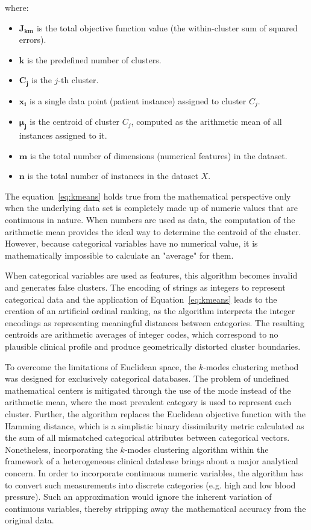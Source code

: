 where:
\begin{itemize}
    \item $\boldsymbol{J_{km}}$ is the total objective function value (the within-cluster sum of squared errors).
    \item $\boldsymbol{k}$ is the predefined number of clusters.
    \item $\boldsymbol{C_j}$ is the $j$-th cluster.
    \item $\boldsymbol{x_i}$ is a single data point (patient instance) assigned to cluster $C_j$.
    \item $\boldsymbol{\mu_j}$ is the centroid of cluster $C_j$, computed as the arithmetic mean of all instances assigned to it.
    \item $\boldsymbol{m}$ is the total number of dimensions (numerical features) in the dataset.
    \item $\boldsymbol{n}$ is the total number of instances in the dataset $X$.
\end{itemize}

\vspace{1em}

The equation~\eqref{eq:kmeans} holds true from the mathematical perspective only when the underlying data set is completely made up of numeric values that are continuous in nature. When numbers are used as data, the computation of the arithmetic mean provides the ideal way to determine the centroid of the cluster. However, because categorical variables have no numerical value, it is mathematically impossible to calculate an "average" for them.

When categorical variables are used as features, this algorithm becomes invalid and generates false clusters. The encoding of strings as integers to represent categorical data and the application of Equation~\eqref{eq:kmeans} leads to the creation of an artificial ordinal ranking, as the algorithm interprets the integer encodings as representing meaningful distances between categories. The resulting centroids are arithmetic averages of integer codes, which correspond to no plausible clinical profile and produce geometrically distorted cluster boundaries.

To overcome the limitations of Euclidean space, the $k$-modes clustering method was designed for exclusively categorical databases. The problem of undefined mathematical centers is mitigated through the use of the mode instead of the arithmetic mean, where the most prevalent category is used to represent each cluster. Further, the algorithm replaces the Euclidean objective function with the Hamming distance, which is a simplistic binary dissimilarity metric calculated as the sum of all mismatched categorical attributes between categorical vectors. Nonetheless, incorporating the $k$-modes clustering algorithm within the framework of a heterogeneous clinical database brings about a major analytical concern. In order to incorporate continuous numeric variables, the algorithm has to convert such measurements into discrete categories (e.g. high and low blood pressure). Such an approximation would ignore the inherent variation of continuous variables, thereby stripping away the mathematical accuracy from the original data.

